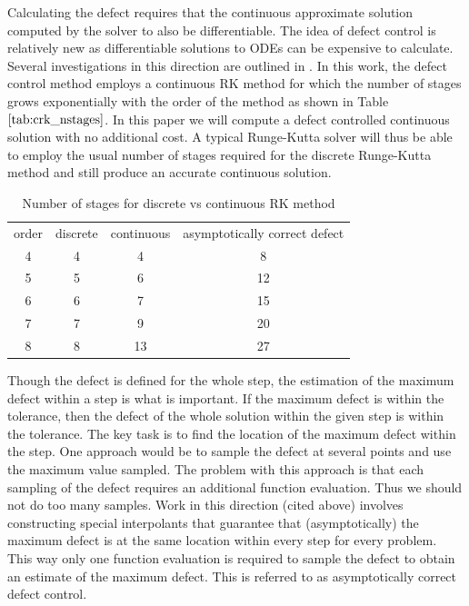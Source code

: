 Calculating the defect requires that the continuous approximate solution computed by the solver to also be differentiable. The idea of defect control is relatively new as differentiable solutions to ODEs can be expensive to calculate. Several investigations in this direction are outlined in \cites{MR2600928}{MR1950917}{MR1803189}{MR1239829}{MR997658}{MR996053}. In this work, the defect control method employs a continuous RK method for which the number of stages grows exponentially with the order of the method as shown in Table $\ref{tab:crk_nstages}$. In this paper we will compute a defect controlled continuous solution with no additional cost. A typical Runge-Kutta solver will thus be able to employ the usual number of stages required for the discrete Runge-Kutta method and still produce an accurate continuous solution.

\begin{table}[h]
\caption {Number of stages for discrete vs continuous RK method} 
\label{tab:crk_nstages}
\begin{center}
\begin{tabular}{ c c c c} 
order   & discrete & continuous & asymptotically correct defect \\ 
4 & 4  & 4   & 8 \\ 
5 & 5  & 6   & 12 \\ 
6 & 6  & 7   & 15 \\ 
7 & 7  & 9   & 20 \\ 
8 & 8  & 13  & 27 \\ 
\end{tabular}
\end{center}
\end{table}

Though the defect is defined for the whole step, the estimation of the maximum defect within a step is what is important. If the maximum defect is within the tolerance, then the defect of the whole solution within the given step is within the tolerance. The key task is to find the location of the maximum defect within the step. One approach would be to sample the defect at several points and use the maximum value sampled. The problem with this approach is that each sampling of the defect requires an additional function evaluation. Thus we should not do too many samples. Work in this direction (cited above) involves constructing special interpolants that guarantee that (asymptotically) the maximum defect is at the same location within every step for every problem. This way only one function evaluation is required to sample the defect to obtain an estimate of the maximum defect. This is referred to as asymptotically correct defect control.

